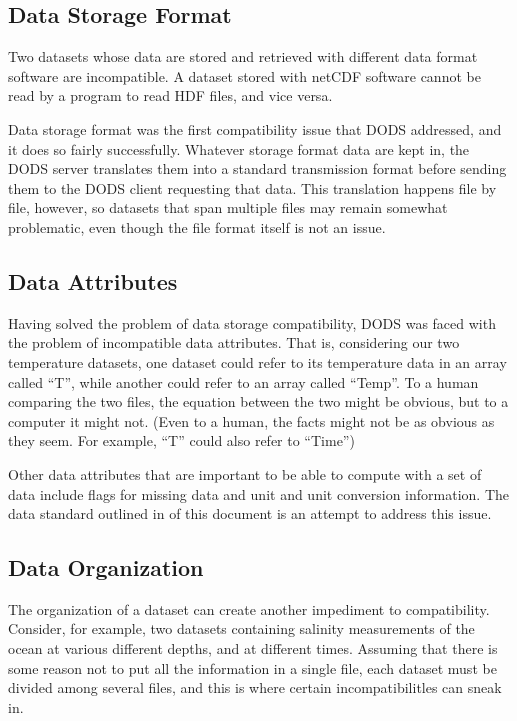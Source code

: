 \subsection{Data Storage Format}

Two datasets whose data are stored and retrieved with different data
format software are incompatible.  A dataset stored with netCDF
software cannot be read by a program to read HDF files, and vice
versa. 

Data storage format was the first compatibility issue
that DODS addressed, and it does so fairly successfully.  Whatever
storage format data are kept in, the DODS server translates them into
a standard transmission format before sending them to the DODS client
requesting that data.  This translation happens file by file, however,
so datasets that span multiple files may remain somewhat problematic,
even though the file format itself is not an issue.


\subsection{Data Attributes}

Having solved the problem of data storage compatibility, DODS was
faced with the problem of incompatible data attributes.  That is,
considering our two temperature datasets, one dataset could refer to
its temperature data in an array called ``T'', while another could
refer to an array called ``Temp''.  To a human comparing the two
files, the equation between the two might be obvious, but to a
computer it might not.  (Even to a human, the facts might not be as
obvious as they seem.  For example, ``T'' could also refer to
``Time'')

Other data attributes that are important to be able to compute with a
set of data include flags for missing data and unit and unit
conversion information.  The data standard outlined in
 of this document is an attempt to address
this issue.



\subsection{Data Organization}

The organization of a dataset can create another impediment to
compatibility.  Consider, for example, two datasets containing
salinity measurements of the ocean at various different depths, and at
different times.  Assuming that there is some reason not to put all
the information in a single file, each dataset must be divided among
several files, and this is where certain incompatibilitles can sneak
in. 

